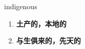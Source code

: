 
\begin{frame}
{\huge indigenous}
\begin{center}
\begin{enumerate}\Large
  \item \textbf{土产的，本地的}
  \item \textbf{与生俱来的，先天的}
\end{enumerate}
\end{center}
\end{frame}
